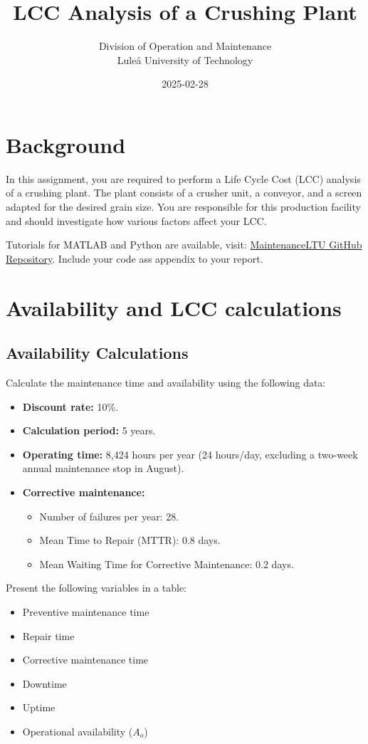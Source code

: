 \documentclass[a4paper,12pt]{exam}
\title{LCC Analysis of a Crushing Plant}
\author{Division of Operation and Maintenance \\
        Lule\aa{} University of Technology}
\date{2025-02-28}
\begin{document}
\maketitle

\section*{Background}
In this assignment, you are required to perform a Life Cycle Cost (LCC) analysis of a crushing plant. The plant consists of a crusher unit, a conveyor, and a screen adapted for the desired grain size. You are responsible for this production facility and should investigate how various factors affect your LCC.


Tutorials for MATLAB and Python are available, visit:  
\href{https://github.com/MaintenanceLTU/D0002B/tree/main/Maintenance%20Cost%20and%20LCC}{MaintenanceLTU GitHub Repository}. Include your code ass appendix to your report. 
\section{Availability and LCC calculations}
\subsection{Availability Calculations}
Calculate the maintenance time and availability using the following data:
\begin{itemize}
    \item \textbf{Discount rate:} 10\%.
    \item \textbf{Calculation period:} 5 years.
    \item \textbf{Operating time:} 8,424 hours per year (24 hours/day, excluding a two-week annual maintenance stop in August).
    \item \textbf{Corrective maintenance:}
    \begin{itemize}
        \item Number of failures per year: 28.
        \item Mean Time to Repair (MTTR): 0.8 days.
        \item Mean Waiting Time for Corrective Maintenance: 0.2 days.
    \end{itemize}
\end{itemize}
Present the following variables in a table: 
\begin{itemize}
    \item Preventive maintenance time
    \item Repair time
    \item Corrective maintenance time
    \item Downtime
    \item Uptime
    \item Operational availability ($A_o$)
\end{itemize}
\end{document}
